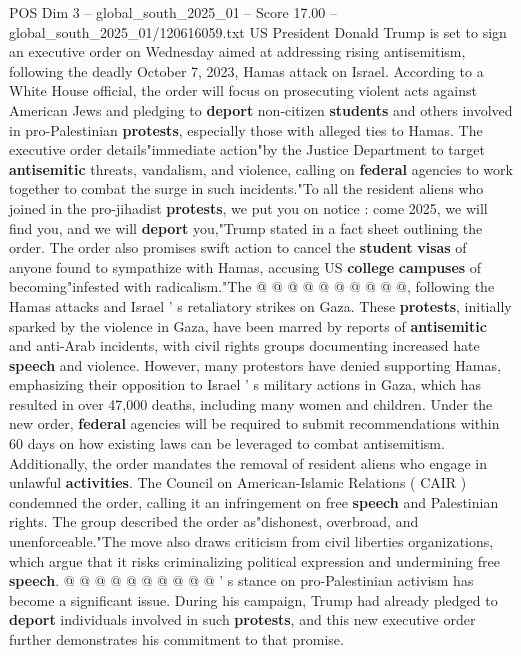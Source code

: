 \begin{textsample}{POS Dim 3 – global\_south\_2025\_01 – Score 17.00 – global\_south\_2025\_01/120616059.txt}  \label{ex:f3_pos_380}
US President Donald Trump is set to sign an executive order on Wednesday aimed at addressing rising antisemitism, following the deadly October 7, 2023, Hamas attack on Israel.
According to a White House official, the order will focus on prosecuting violent acts against American Jews and pledging to \textbf{deport} non-citizen \textbf{students} and others involved in pro-Palestinian \textbf{protests}, especially those with alleged ties to Hamas.
The executive order details"immediate action"by the Justice Department to target \textbf{antisemitic} threats, vandalism, and violence, calling on \textbf{federal} agencies to work together to combat the surge in such incidents."To all the resident aliens who joined in the pro-jihadist \textbf{protests}, we put you on notice : come 2025, we will find you, and we will \textbf{deport} you,"Trump stated in a fact sheet outlining the order.
The order also promises swift action to cancel the \textbf{student} \textbf{visas} of anyone found to sympathize with Hamas, accusing US \textbf{college} \textbf{campuses} of becoming"infested with radicalism."The @ @ @ @ @ @ @ @ @ @, following the Hamas attacks and Israel ' s retaliatory strikes on Gaza.
These \textbf{protests}, initially sparked by the violence in Gaza, have been marred by reports of \textbf{antisemitic} and anti-Arab incidents, with civil rights groups documenting increased hate \textbf{speech} and violence.
However, many protestors have denied supporting Hamas, emphasizing their opposition to Israel ' s military actions in Gaza, which has resulted in over 47,000 deaths, including many women and children.
Under the new order, \textbf{federal} agencies will be required to submit recommendations within 60 days on how existing laws can be leveraged to combat antisemitism.
Additionally, the order mandates the removal of resident aliens who engage in unlawful \textbf{activities}.
The Council on American-Islamic Relations ( CAIR ) condemned the order, calling it an infringement on free \textbf{speech} and Palestinian rights.
The group described the order as"dishonest, overbroad, and unenforceable."The move also draws criticism from civil liberties organizations, which argue that it risks criminalizing political expression and undermining free \textbf{speech}. @ @ @ @ @ @ @ @ @ @ ' s stance on pro-Palestinian activism has become a significant issue.
During his campaign, Trump had already pledged to \textbf{deport} individuals involved in such \textbf{protests}, and this new executive order further demonstrates his commitment to that promise.

\end{textsample}
